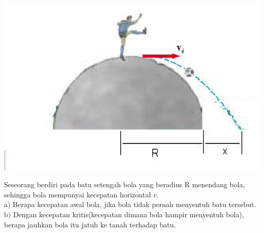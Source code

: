 \item
\mbox{}
\begin{center}
\includegraphics [scale=0.7]{latex/eps/1_4_2_image_1.eps}
\end{center}
Seseorang berdiri pada batu setengah bola yang beradius R menendang bola, sehingga bola mempunyai kecepatan horizontal $v$. \\ a$)$ Berapa kecepatan awal bola, jika bola tidak pernah menyentuh batu tersebut. \\
b$)$ Dengan kecepatan kritis(kecepatan dimana bola hampir menyentuh bola), berapa jauhkan bola itu jatuh ke tanah terhadap batu.

